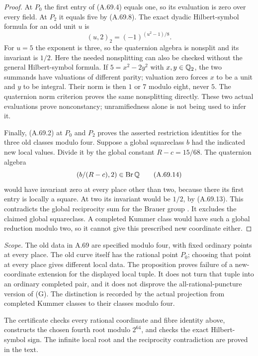 \begin{proof}
At $P_0$ the first entry of (A.69.4) equals one, so its
evaluation is zero over every field.  At $P_2$ it equals
five by (A.69.8).  The exact dyadic Hilbert-symbol formula
for an odd unit $u$ is
\[
                    (u,2)_2=(-1)^{(u^2-1)/8}.
 \tag{A.69.13}
\]
For $u=5$ the exponent is three, so the quaternion algebra
is nonsplit and its invariant is $1/2$.
Here the needed nonsplitting can also be checked without
the general Hilbert-symbol formula.  If $5=x^2-2y^2$
with $x,y\in\mathbb Q_2$, the two summands have valuations of
different parity; valuation zero forces $x$ to be a unit
and $y$ to be integral.  Their norm is then $1$ or $7$
modulo eight, never $5$.  The quaternion norm criterion
\cite[Proposition 1.1.7]{AgentCTSkoro2019} proves the same
nonsplitting directly.
These two actual evaluations prove nonconstancy; unramifiedness
alone is not being used to infer it.

Finally, (A.69.2) at $P_0$ and $P_2$ proves the asserted
restriction identities for the three old classes modulo four.
Suppose a global squareclass $b$ had the indicated new local
values.  Divide it by the global constant $R-c=15/68$.
The quaternion algebra
\[
                       \left(b/(R-c),2\right)
                              \in\operatorname{Br}\mathbb Q
 \tag{A.69.14}
\]
would have invariant zero at every place other than two,
because there its first entry is locally a square.  At two
its invariant would be $1/2$, by (A.69.13).
This contradicts the global reciprocity sum for the Brauer
group \cite[Theorem 12.1.8]{AgentCTSkoro2019}.
It excludes the claimed global squareclass.
A completed Kummer class would have such a global reduction
modulo two, so it cannot give this prescribed new coordinate
either.
\end{proof}

\noindent\emph{Scope.}
The old data in A.69 are specified modulo four, with fixed
ordinary points at every place.  The old curve itself has the
rational point $P_0$; choosing that point at every place gives
different local data.  The proposition proves failure of a
new-coordinate extension for the displayed local tuple.
It does not turn that tuple into an ordinary completed pair,
and it does not disprove the all-rational-puncture version of
(G).  The distinction is recorded by the actual projection
from completed Kummer classes to their classes modulo four.

The certificate 
checks every rational coordinate and fibre identity above,
constructs the chosen fourth root modulo $2^{64}$, and checks
the exact Hilbert-symbol sign.  The infinite local root and
the reciprocity contradiction are proved in the text.
